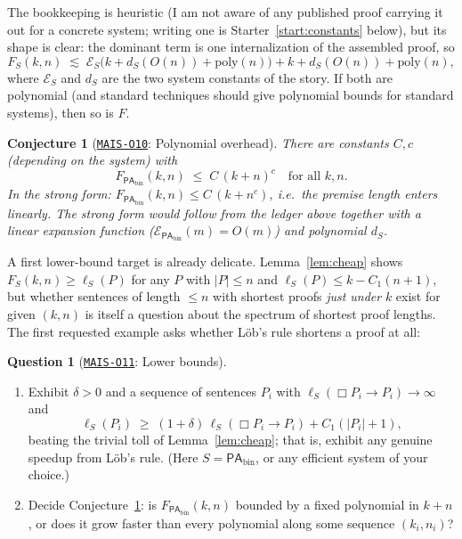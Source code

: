 \documentclass[11pt]{amsart}
\newcommand{\Oid}[1]{\href{https://github.com/lionellevine/MAIS/blob/main/open-problems/MAIS-O#1.md}{\texttt{MAIS-O#1}}}
\theoremstyle{plain}
\newtheorem{conjecture}[theorem]{Conjecture}
\theoremstyle{definition}
\newtheorem{question}[theorem]{Question}
\newcommand{\PAbin}{\mathsf{PA}_{\mathrm{bin}}}
\begin{document}
The bookkeeping is heuristic (I am not aware of any published proof carrying it out for a concrete system; writing one is Starter~\ref{start:constants} below), but its shape is clear: the dominant term is one internalization of the assembled proof, so
\[
F_S(k,n) \;\lesssim\; \mathcal{E}_S\bigl(k + d_S(O(n)) + \mathrm{poly}(n)\bigr) + k + d_S(O(n)) + \mathrm{poly}(n),
\]
where $\mathcal{E}_S$ and $d_S$ are the two system constants of the story. If both are polynomial (and standard techniques \cite{pudlak1998} should give polynomial bounds for standard systems), then so is $F$.

\begin{conjecture}[\Oid{10}: Polynomial overhead]
\label{conj:poly}
There are constants $C, c$ (depending on the system) with
\[
F_{\PAbin}(k,n) \;\le\; C\,(k+n)^{c} \quad \text{for all } k, n.
\]
In the strong form: $F_{\PAbin}(k,n) \le C\,(k + n^{c})$, i.e.\ the premise length enters linearly. The strong form would follow from the ledger above together with a linear expansion function ($\mathcal{E}_{\PAbin}(m) = O(m)$) and polynomial $d_S$.
\end{conjecture}

A first lower-bound target is already delicate. Lemma~\ref{lem:cheap} shows $F_S(k,n) \ge \ell_S(P)$ for any $P$ with $|P| \le n$ and $\ell_S(P) \le k - C_1(n+1)$, but whether sentences of length $\le n$ with shortest proofs \emph{just under} $k$ exist for given $(k,n)$ is itself a question about the spectrum of shortest proof lengths. The first requested example asks whether L\"ob's rule shortens a proof at all:

\begin{question}[\Oid{11}: Lower bounds]
\label{q:lower}
\hspace{1em}
\begin{enumerate}
\item Exhibit $\delta > 0$ and a sequence of sentences $P_i$ with $\ell_S(\Box P_i \to P_i) \to \infty$ and
\[
\ell_S(P_i) \;\ge\; (1+\delta)\,\ell_S(\Box P_i \to P_i) + C_1(|P_i|+1),
\]
beating the trivial toll of Lemma~\ref{lem:cheap}; that is, exhibit any genuine speedup from L\"ob's rule. (Here $S = \PAbin$, or any efficient system of your choice.)
\item Decide Conjecture~\ref{conj:poly}: is $F_{\PAbin}(k,n)$ bounded by a fixed polynomial in $k+n$, or does it grow faster than every polynomial along some sequence $(k_i, n_i)$?
\end{enumerate}
\end{question}
\end{document}
